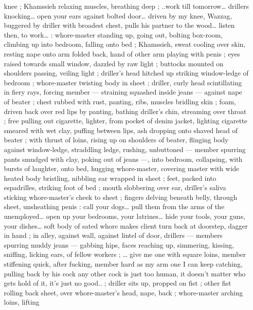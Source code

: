 knee ; Khamssieh relaxing muscles, breathing deep ; {\gl}..work till 
tomorrow{\ldots} drillers knocking{\ldots} open your ears against bolted door{\ldots} 
driven by my knee, Wazzag, buggered by driller with broadest chest, 
pulls his partner to the wood{\ldots} listen then, to work{\ldots}{\gr} : whore-master 
standing up, going out, bolting box-room, climbing up into bedroom, 
falling onto bed ; Khamssieh, sweat cooling over skin, resting nape 
onto arm folded back, hand of other arm playing with penis ; eyes 
raised towards small window, dazzled by raw light ; buttocks mounted 
on shoulders passing, veiling light ; driller's head hitched up striking 
window-ledge of bedroom ; whore-master twisting body in sheet ; 
driller, curly head scintillating in fiery rays, forcing member --- 
straining squashed inside jeans --- against nape of beater ; chest 
rubbed with rust, panting, ribs, muscles bridling skin ; foam, driven 
back over red lips by panting, bathing driller's chin, streaming over 
throat ; free pulling out cigarette, lighter, from pocket of denim 
jacket, lighting cigarette smeared with wet clay, puffing between lips, 
ash dropping onto shaved head of beater ; with thrust of loins, rising 
up on shoulders of beater, flinging body against window-ledge, 
straddling ledge, rushing, unbuttoned --- member spurring pants 
smudged with clay, poking out of jeans ---, into bedroom, collapsing, 
with bursts of laughter, onto bed, hugging whore-master, covering 
master with wide heated body bristling, nibbling ear wrapped in sheet 
; feet, packed into espadrilles, striking foot of bed ; mouth 
slobbering over ear, driller's saliva sticking whore-master's cheek to 
sheet ; fingers delving beneath belly, through sheet, unsheathing 
penis :{\td} {\gl} call your dogs{\ldots} pull them from the arms of the 
unemployed{\ldots} open up your bedrooms, your latrines{\ldots} hide your 
tools, your guns, your dishes{\ldots} soft body of sated whore makes 
client turn back at doorstep, dagger in hand{\td} {\gr} ; in alley, against wall, 
against lintel of door, drillers --- members spurring muddy jeans --- 
gabbing hips, faces reaching up, simmering, kissing, sniffing, licking 
ears, of fellow workers ; {\ldots} {\gl}{\td} give me one with square loins, member 
stiffening quick, after fucking, member hard as my arm{\td} one I can 
keep catching, pulling back by his cock{\td} any other cock is just too 
human, it doesn't matter who gets hold of it, it's just no good..{\gr} ; 
driller sits up, propped on fist ; other fist rolling back sheet, over 
whore-master's head, nape, back ; whore-master arching loins, lifting 
